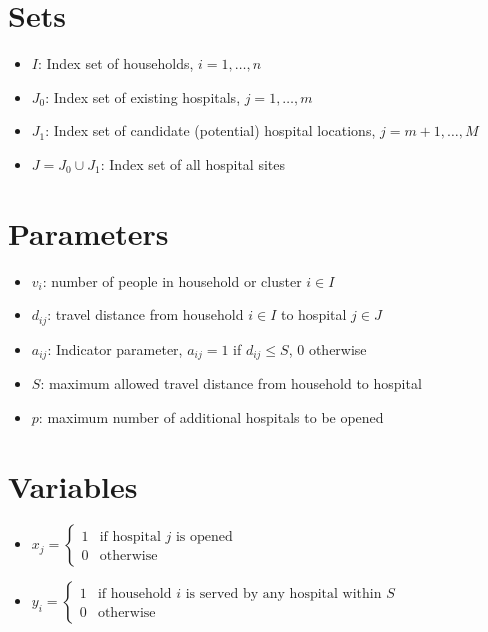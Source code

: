 \documentclass{article}
\begin{document}
\section{Sets}
\begin{itemize}[leftmargin=*,nosep]
    \item $I$: Index set of households, $i = 1, \ldots, n$
    \item $J_0$: Index set of existing hospitals, $j = 1, \ldots, m$
    \item $J_1$: Index set of candidate (potential) hospital locations, $j = m+1, \ldots, M$
    \item $J = J_0 \cup J_1$: Index set of all hospital sites
\end{itemize}

\section{Parameters}
\begin{itemize}[leftmargin=*,nosep]
    \item $v_i$: number of people in household or cluster $i \in I$
    \item $d_{ij}$: travel distance from household $i \in I$ to hospital $j \in J$
    \item $a_{ij}$: Indicator parameter, $a_{ij} = 1$ if $d_{ij} \leq S$, $0$ otherwise
    \item $S$: maximum allowed travel distance from household to hospital
    \item $p$: maximum number of additional hospitals to be opened
\end{itemize}

\section{Variables}
\begin{itemize}[leftmargin=*,nosep]
    \item $x_j = \begin{cases} 
        1 & \text{if hospital } j \text{ is opened} \\
        0 & \text{otherwise}
    \end{cases}$
    \item $y_i = \begin{cases} 
        1 & \text{if household } i \text{ is served by any hospital within } S \\
        0 & \text{otherwise}
    \end{cases}$
\end{itemize}
\end{document}
